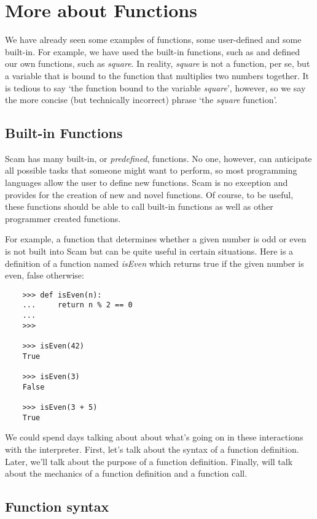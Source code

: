 \chapter{More about Functions}
\label{MoreAboutFunctions}

We have already seen some examples of functions,
some user-defined and some built-in.
For example, we have used the built-in functions,
such as 
{\tt *} and defined our own functions,
such as {\it square}.
In reality, {\it square} is not a function, per se, but a variable
that is bound to the function that multiplies two numbers
together. It is tedious to say `the function bound to
the variable {\it square}', however,
so we say the more concise (but technically incorrect)
phrase `the {\it square} function'.

\section{Built-in Functions}

Scam has many built-in, or {\it predefined}, functions.
No one, however,
can anticipate all possible tasks that someone might want to perform,
so most programming languages allow the user to define new functions.
Scam is no exception and provides
for the creation of new and novel functions.
Of course,
to be useful,
these functions should be able to call
built-in functions as well as other programmer created
functions.

For example, a function that determines whether a given
number is odd or even is not built into Scam but can be
quite useful in certain situations.
Here is a definition
of a function named {\it isEven} which returns true if the
given number is even, false otherwise:

\begin{verbatim}
    >>> def isEven(n):
    ...     return n % 2 == 0
    ...
    >>>

    >>> isEven(42)
    True

    >>> isEven(3)
    False

    >>> isEven(3 + 5)
    True
\end{verbatim}

We could spend days talking about about what's going on in these
interactions with the interpreter. First, let's talk
about the syntax of a function definition. Later, we'll
talk about the purpose of a function definition. Finally,
will talk about the mechanics of a function definition
and a function call.

\section{Function syntax}

